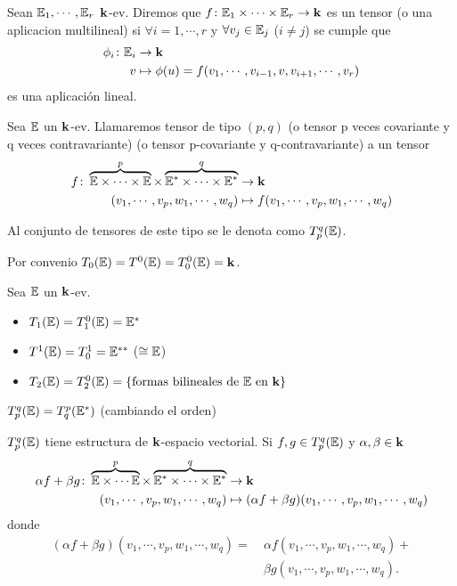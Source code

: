 \begin{defi}
	Sean $\mathbb{E}_1,\cdots , \mathbb{E}_r$ $\mathbf{k}$-ev. Diremos que
	$f \colon \mathbb{E}_1 \times \cdots \times \mathbb{E}_r \to \mathbf{k}$ es un tensor (o una aplicacion
	multilineal) si $\forall i=1,\cdots , r$ y $\forall v_j \in \mathbb{E}_j$ ($i \neq j$)
	se cumple que
	\[
		 \begin{aligned}
			 \phi_i \colon \mathbb{E}_i &\to \mathbf{k} \\
			 v &\mapsto \phi(u)=f(v_1,\cdots , v_{i-1}, v, v_{i+1}, \cdots , v_r)
		 \end{aligned}
	\]
	es una aplicación lineal.
\end{defi}
\begin{defi}
	Sea $\mathbb{E}$ un $\mathbf{k}$-ev. Llamaremos tensor de tipo $(p,q)$ (o tensor p veces
	covariante y q veces contravariante) (o tensor p-covariante y q-contravariante)
	a un tensor
	\[
		\begin{aligned}
			f \colon \overbrace{\mathbb{E} \times \cdots \times \mathbb{E}}^p\times
			\overbrace{\mathbb{E}^* \times \cdots \times \mathbb{E}^*}^q&\to \mathbf{k} \\
			(v_1, \cdots, v_p, w_1, \cdots, w_q) &\mapsto
			f(v_1,\cdots,v_p,w_1,\cdots,w_q)
		\end{aligned}
	\]
\end{defi}
\begin{obs}
	Al conjunto de tensores  de este tipo se le denota como $T_p^q(\mathbb{E})$.
\end{obs}
\begin{obs}
	Por convenio $T_0(\mathbb{E}) = T^0(\mathbb{E}) = T_0^0(\mathbb{E}) = \mathbf{k}$.
\end{obs}
\begin{example}
	Sea $\mathbb{E}$ un $\mathbf{k}$-ev.
	\begin{itemize}
		\item $T_1(\mathbb{E}) = T_1^0(\mathbb{E}) = \mathbb{E}^*$
		\item $T^1(\mathbb{E}) = T_0^1 = \mathbb{E}^{**}$ ($\cong \mathbb{E}$)
		\item $T_2(\mathbb{E}) = T_2^0(\mathbb{E}) = \{\text{formas bilineales de } \mathbb{E} \text{ en } \mathbf{k}\}$
	\end{itemize}
\end{example}
\begin{prop}
	$T_p^q(\mathbb{E}) = T_q^p(\mathbb{E}^*)$ (cambiando el orden)
\end{prop}
\begin{prop}
	$T_p^q(\mathbb{E})$ tiene estructura de $\mathbf{k}$-espacio vectorial. Si $f, g \in T_p^q(\mathbb{E})$ y
	$\alpha , \beta \in \mathbf{k}$
	\[
		\begin{aligned}
			\alpha f + \beta g \colon \overbrace{\mathbb{E} \times \cdots \mathbb{E}}^p \times
			\overbrace{\mathbb{E}^* \times \cdots \times \mathbb{E}^*}^q &\to \mathbf{k} \\
			(v_1, \cdots, v_p, w_1, \cdots, w_q) &\mapsto (\alpha f + \beta g)
			(v_1, \cdots, v_p, w_1, \cdots, w_q)
		\end{aligned}
	\]
	donde 
	\[
	\begin{aligned}
	(\alpha f + \beta g) (v_1, \cdots, v_p, w_1, \cdots, w_q) = \ 
	&\alpha f(v_1, \cdots, v_p, w_1, \cdots, w_q) + \\ 
	&\beta g(v_1, \cdots, v_p, w_1, \cdots, w_q).
	\end{aligned}
	\]
\end{prop}
